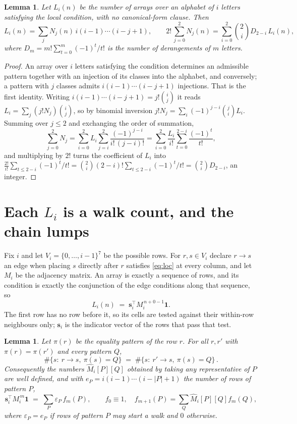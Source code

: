 \documentclass[11pt,a4paper]{article}
\theoremstyle{plain}
\newtheorem{lemma}[theorem]{Lemma}
\theoremstyle{definition}
\begin{document}
\begin{lemma}\label{lem:inv}
Let $L_i(n)$ be the number of arrays over an alphabet of $i$ letters satisfying the local
condition, with no canonical-form clause. Then
\[
L_i(n)=\sum_j N_j(n)\,i(i-1)\cdots(i-j+1),
\qquad
2!\,\sum_{j=0}^{2}N_j(n)=\sum_{i=0}^{2}\binom{2}{i}D_{2-i}\,L_i(n),
\]
where $D_m=m!\sum_{t=0}^{m}(-1)^t/t!$ is the number of derangements of $m$ letters.
\end{lemma}

\begin{proof}
An array over $i$ letters satisfying the condition determines an admissible pattern together
with an injection of its classes into the alphabet, and conversely; a pattern with $j$
classes admits $i(i-1)\cdots(i-j+1)$ injections. That is the first identity. Writing
$i(i-1)\cdots(i-j+1)=j!\binom{i}{j}$ it reads $L_i=\sum_j (j!N_j)\binom{i}{j}$, so by
binomial inversion $j!N_j=\sum_{i}(-1)^{j-i}\binom{j}{i}L_i$. Summing over
$j\le 2$ and exchanging the order of summation,
\[
\sum_{j=0}^{2}N_j=\sum_{i=0}^{2}L_i\sum_{j=i}^{2}\frac{(-1)^{j-i}}{i!\,(j-i)!}
=\sum_{i=0}^{2}\frac{L_i}{i!}\sum_{t=0}^{2-i}\frac{(-1)^t}{t!} ,
\]
and multiplying by $2!$ turns the coefficient of $L_i$ into
$\frac{2!}{i!}\sum_{t\le 2-i}(-1)^t/t!=\binom{2}{i}(2-i)!\sum_{t\le 2-i}(-1)^t/t!
=\binom{2}{i}D_{2-i}$, an integer.
\end{proof}

\section{Each $L_i$ is a walk count, and the chain lumps}

Fix $i$ and let $V_i=\{0,\dots,i-1\}^{7}$ be the possible rows. For $r,s\in V_i$
declare $r\to s$ an edge when placing $s$ directly after $r$ satisfies \eqref{eq:loc} at
every column, and let $M_i$ be the adjacency matrix. An array is exactly a sequence of
rows, and its condition is exactly the conjunction of the edge conditions along that
sequence, so
\[
L_i(n)\;=\;\mathbf{s}_i^{\!\top}M_i^{\,n+0-1}\mathbf{1} .
\]
The first row has no row before it, so its cells are tested
against their within-row neighbours only; $\mathbf{s}_i$ is the indicator vector of the
rows that pass that test.

\begin{lemma}\label{lem:lump}
Let $\pi(r)$ be the equality pattern of the row $r$. For all $r,r'$ with
$\pi(r)=\pi(r')$ and every pattern $Q$,
\[
\#\{s:\ r\to s,\ \pi(s)=Q\}\;=\;\#\{s:\ r'\to s,\ \pi(s)=Q\}\, .
\]
Consequently the numbers $\widehat M_i[P][Q]$ obtained by taking any representative of $P$
are well defined, and with $e_P=i(i-1)\cdots(i-|P|+1)$ the number of rows of pattern $P$,
\[
\mathbf{s}_i^{\!\top}M_i^{\,m}\mathbf{1}\;=\;\sum_P \varepsilon_P\,f_m(P),
\qquad f_0\equiv1,\quad f_{m+1}(P)=\sum_Q\widehat M_i[P][Q]f_m(Q),
\]
where $\varepsilon_P=e_P$ if rows of pattern $P$ may start a walk and $0$ otherwise.
\end{lemma}
\end{document}
